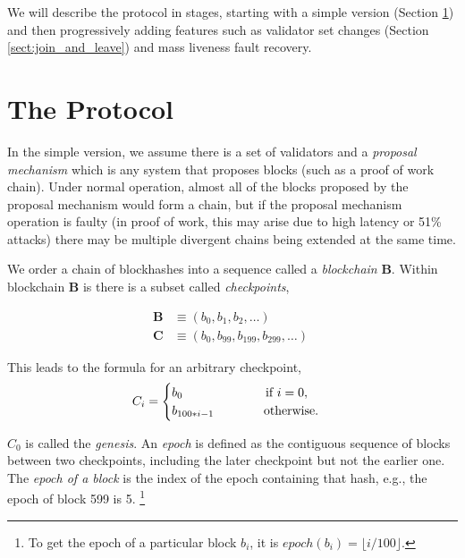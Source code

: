 \documentclass[12pt, final]{article}
\begin{document}
We will describe the protocol in stages, starting with a simple version (Section \ref{sect:protocol}) and then progressively adding features such as validator set changes (Section \ref{sect:join_and_leave}) and mass liveness fault recovery.

\section{The Protocol}
\label{sect:protocol}

In the simple version, we assume there is a set of validators and a \textit{proposal mechanism} which is any system that proposes blocks (such as a proof of work chain). Under normal operation, almost all of the blocks proposed by the proposal mechanism would form a chain, but if the proposal mechanism operation is faulty (in proof of work, this may arise due to high latency or 51\% attacks) there may be multiple divergent chains being extended at the same time.


We order a chain of blockhashes into a sequence called a \emph{blockchain} $\mathbf{B}$.  Within blockchain $\mathbf{B}$ is there is a subset called \emph{checkpoints},

\begin{equation}
\begin{split}
    \mathbf{B} &\equiv \left( b_0, b_1, b_2, \ldots \right) \\
    \mathbf{C} &\equiv \left( b_0, b_{99}, b_{199}, b_{299}, \ldots \right) \;
\end{split}
\end{equation}

This leads to the formula for an arbitrary checkpoint,
\begin{equation}
    C_i = \begin{cases}
     b_0 \qquad \qquad \qquad\ \  \textnormal{if } i = 0, \\
     b_{ 100*i - 1 } \qquad \qquad \textnormal{otherwise.}
     \end{cases}
\end{equation}

$C_0$ is called the \textit{genesis}. An \emph{epoch} is defined as the contiguous sequence of blocks between two checkpoints, including the later checkpoint but not the earlier one.  The \textit{epoch of a block} is the index of the epoch containing that hash, e.g., the epoch of block 599 is 5. \footnote{To get the epoch of a particular block $b_i$, it is $epoch(b_i) = \lfloor i / 100 \rfloor$.}
\end{document}
